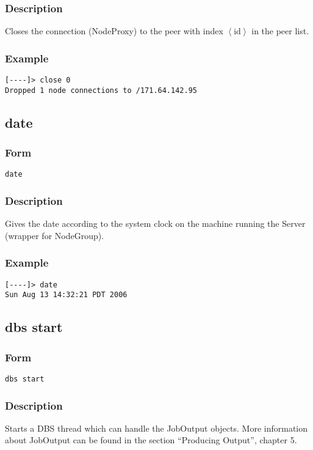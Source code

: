 \documentclass[12pt]{article}
\begin{document}
\subsubsection{Description}
Closes the connection (NodeProxy) to the peer with index $\left<\text{id}\right>$ in the peer list.
\subsubsection{Example}
\begin{verbatim}
[----]> close 0
Dropped 1 node connections to /171.64.142.95
\end{verbatim}

\subsection{date}
\subsubsection{Form}
\begin{verbatim}
date
\end{verbatim}
\subsubsection{Description}
Gives the date according to the system clock on the machine running the Server (wrapper for NodeGroup).
\subsubsection{Example}
\begin{verbatim}
[----]> date
Sun Aug 13 14:32:21 PDT 2006
\end{verbatim}

\subsection{dbs start}
\subsubsection{Form}
\begin{verbatim}
dbs start
\end{verbatim}
\subsubsection{Description}
Starts a DBS thread which can handle the JobOutput objects. More information about JobOutput can be found in the section ``Producing Output'', chapter 5.
\end{document}
